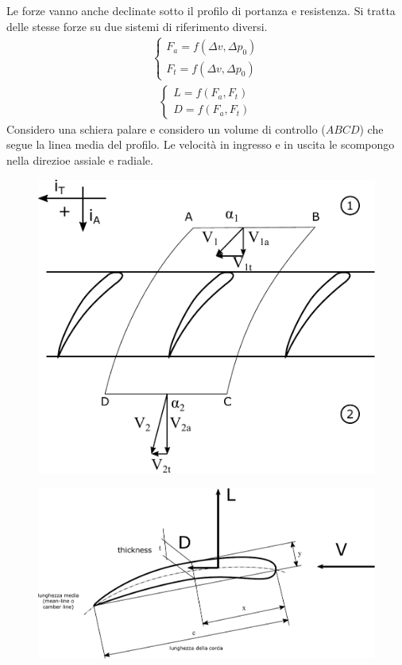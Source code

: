 Le forze vanno anche declinate sotto il profilo di portanza e resistenza. Si tratta delle stesse forze su due sistemi di riferimento diversi. 
\begin{align*}
	\begin{cases}
		F_a = f(\Delta v, \Delta p_0)\\
		F_t = f(\Delta v, \Delta p_0)
	\end{cases}
\end{align*}
\begin{align*}
	\begin{cases}
		L = f(F_a,F_t)\\
		D = f(F_a,F_t)
	\end{cases}
\end{align*}
Considero una schiera palare e considero un volume di controllo ($ABCD$) che segue la linea media del profilo. Le velocità in ingresso e in uscita le scompongo nella direzioe assiale e radiale. 
\begin{figure}
\centering
\begin{minipage}{.4\textwidth}
  \centering
  \includegraphics[width=.95\linewidth]{fig/schiera1.pdf}
  \label{fig:schiera1}
\end{minipage}%
\begin{minipage}{.6\textwidth}
  \centering
  \includegraphics[width=.85\linewidth]{fig/LDref.pdf}
  \label{fig:LDref}
\end{minipage}
\end{figure}
